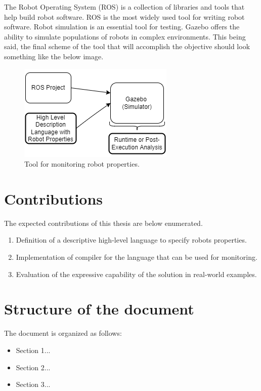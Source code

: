 \par

The Robot Operating System (ROS) is a collection of libraries and tools that help 
build robot software. ROS is the most widely used tool for writing robot software.
Robot simulation is an essential tool for testing. Gazebo offers the ability 
to simulate populations of robots in complex environments.
This being said, the final scheme of the tool that will accomplish the objective 
should look something like the below image.

\begin{figure}[h!]
    \includegraphics{images/intro_diag.png}
    \caption{Tool for monitoring robot properties.}
    \label{fig:intro_objectives}
\end{figure}

\section{Contributions}
\label{sec:contributions}

The expected contributions of this thesis are below enumerated.

\begin{enumerate}
    \item Definition of a descriptive high-level language to specify robots properties.
    \item Implementation of compiler for the language that can be used for monitoring.
    \item Evaluation of the expressive capability of the solution in real-world examples.
\end{enumerate}

\section{Structure of the document}
\label{sec:structure}

The document is organized as follows:

\begin{itemize}
    \item Section 1...
    \item Section 2...
    \item Section 3...
\end{itemize}

